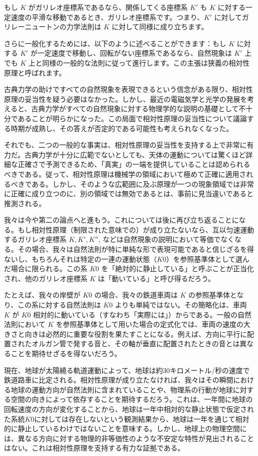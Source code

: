 \documentclass[a4paper,11pt,openany]{ltjsbook}
\begin{document}
もし $K$ がガリレオ座標系であるなら、関係してくる座標系 $K′$ も $K$ に対する一定速度の平滑な移動であるとき、ガリレオ座標系です。つまり、$K′$ に対してガリレーニュートンの力学法則は $K$ に対して同様に成り立ちます。

さらに一般化するためには、以下のように述べることができます：もし $K$ に対する $K′$ が一定速度で移動し、回転がない座標系であるなら、自然現象は $K′$ 上でも $K$ 上と同様の一般的な法則に従って進行します。この主張は狭義の相対性原理と呼ばれます。

古典力学の助けですべての自然現象を表現できるという信念がある限り、相対性原理の妥当性を疑う必要はなかった。しかし、最近の電磁気学と光学の発展を考えると、古典力学がすべての自然現象に対する物理学的な説明の基礎として不十分であることが明らかになった。この局面で相対性原理の妥当性について議論する時期が成熟し、その答えが否定的である可能性も考えられなくなった。

それでも、二つの一般的な事実は、相対性原理の妥当性を支持する上で非常に有力だ。古典力学が十分に広範でないとしても、天体の運動については驚くほど詳細な正確さで予測できるため、「真実」の一端を提供していることは認められるべきである。従って、相対性原理は機械学の領域において極めて正確に適用されるべきである。しかし、そのような広範囲に及ぶ原理が一つの現象領域では非常に正確に成り立つのに、別の領域では無効であるとは、事前に見当違いであると推測される。

我々は今や第二の論点へと進もう。これについては後に再び立ち返ることになる。もし相対性原理（制限された意味での）が成り立たないなら、互以匀速運動するガリレオ座標系 $K, K′, K″$, などは自然現象の説明において等価でなくなる。その場合、我々は自然法則が特に単純な形で表現可能であると信じざるを得ないし、もちろんそれは特定の一連の運動状態（$K0$）を参照基準体として選んだ場合に限られる。この系 $K0$ を「絶対的に静止している」と呼ぶことが正当化され、他のガリレオ座標系 $K$ は「動いている」と呼び得るだろう。

たとえば、我々の岸壁が $K0$ の場合、我々の鉄道車両は $K$ の参照基準体となり、この系に対する自然法則は $K0$ よりも単純ではない。その簡略化は、車両 $K$ が $K0$ 相対的に動いている（すなわち「実際には」）からである。一般の自然法則において $K$ を参照基準体として用いた場合の定式化では、車両の速度の大きさと向きは必然的に重要な役割を果たすことになる。例えば、方向に平行に配置されたオルガン管で発する音と、その軸が垂直に配置されたときの音とは異なることを期待せざるを得ないだろう。

現在、地球が太陽繞る軌道運動によって、地球は約30キロメートル/秒の速度で鉄道路車に比定される。相対性原理が成り立たなければ、我々はその瞬間における地球の運動方向が自然法則に含まれていることや、物理系の行動が地球に対する空間の向きによって依存することを期待するだろう。これは、一年間に地球の回転速度の方向が変化することから、地球は一年中相対的な静止状態で仮定された系統$K0$に対しては存在しないという観測結果から、地球は一年を通じて相対的に静止しているわけではないことを意味する。しかし、地球上の物理空間には、異なる方向に対する物理的非等価性のような不安定な特性が見出されることはない。これは相対性原理を支持する有力な証拠である。
\end{document}
